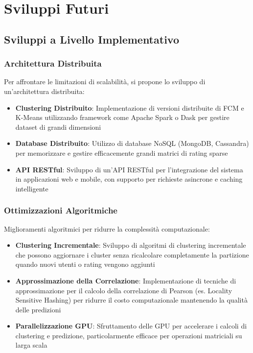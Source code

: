 \section{Sviluppi Futuri}

\subsection{Sviluppi a Livello Implementativo}

\subsubsection{Architettura Distribuita}

Per affrontare le limitazioni di scalabilità, si propone lo sviluppo di un'architettura distribuita:

\begin{itemize}
    \item \textbf{Clustering Distribuito}: Implementazione di versioni distribuite di FCM e K-Means utilizzando framework come Apache Spark o Dask per gestire dataset di grandi dimensioni
    
    \item \textbf{Database Distribuito}: Utilizzo di database NoSQL (MongoDB, Cassandra) per memorizzare e gestire efficacemente grandi matrici di rating sparse
    
    \item \textbf{API RESTful}: Sviluppo di un'API RESTful per l'integrazione del sistema in applicazioni web e mobile, con supporto per richieste asincrone e caching intelligente
\end{itemize}

\subsubsection{Ottimizzazioni Algoritmiche}

Miglioramenti algoritmici per ridurre la complessità computazionale:

\begin{itemize}
    \item \textbf{Clustering Incrementale}: Sviluppo di algoritmi di clustering incrementale che possono aggiornare i cluster senza ricalcolare completamente la partizione quando nuovi utenti o rating vengono aggiunti
    
    \item \textbf{Approssimazione della Correlazione}: Implementazione di tecniche di approssimazione per il calcolo della correlazione di Pearson (es. Locality Sensitive Hashing) per ridurre il costo computazionale mantenendo la qualità delle predizioni
    
    \item \textbf{Parallelizzazione GPU}: Sfruttamento delle GPU per accelerare i calcoli di clustering e predizione, particolarmente efficace per operazioni matriciali su larga scala
\end{itemize}

